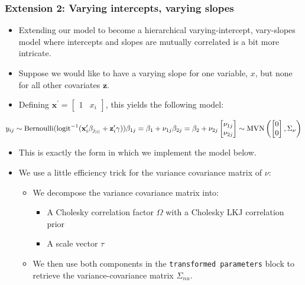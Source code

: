 \documentclass[
  11pt,
]{article}
\providecommand{\tightlist}{%
  \setlength{\itemsep}{0pt}\setlength{\parskip}{0pt}}
\begin{document}
\hypertarget{extension-2-varying-intercepts-varying-slopes}{%
\subsubsection{Extension 2: Varying intercepts, varying slopes}\label{extension-2-varying-intercepts-varying-slopes}}

\begin{itemize}
\tightlist
\item
  Extending our model to become a hierarchical varying-intercept, vary-slopes model where intercepts and slopes are mutually correlated is a bit more intricate.
\item
  Suppose we would like to have a varying slope for one variable, \(x\), but none for all other covariates \(\mathbf{z}\).
\item
  Defining \(\mathbf{x}^{\prime} = \begin{bmatrix} 1 & x_i \end{bmatrix}\), this yields the following model:
\end{itemize}

\[y_{ij} \sim \text{Bernoulli}(\text{logit}^{-1}(\mathbf{x}_i^{\prime} \beta_{j_{[i]}} + \mathbf{z} _i^{\prime} \gamma)) \\
\beta_{1j} = \beta_1 + \nu_{1j} \\
\beta_{2j} = \beta_2 + \nu_{2j} \\
\begin{bmatrix} \nu_{1j} \\ \nu_{2j} \end{bmatrix} \sim \text{MVN}\left( \begin{bmatrix} 0 \\ 0 \end{bmatrix}, \Sigma_{\nu} \right)\]

\begin{itemize}
\tightlist
\item
  This is exactly the form in which we implement the model below.
\item
  We use a little efficiency trick for the variance covariance matrix of \(\nu\):

  \begin{itemize}
  \tightlist
  \item
    We decompose the variance covariance matrix into:

    \begin{itemize}
    \tightlist
    \item
      A Cholesky correlation factor \(\Omega\) with a Cholesky LKJ correlation prior
    \item
      A scale vector \(\tau\)
    \end{itemize}
  \item
    We then use both components in the \texttt{transformed\ parameters} block to retrieve the variance-covariance matrix \(\Sigma_{nu}\).
  \end{itemize}
\end{itemize}
\end{document}
